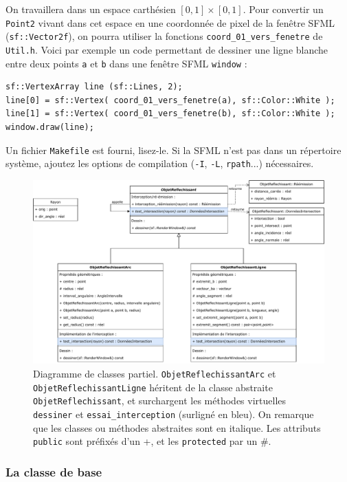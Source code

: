 \documentclass{book}
\newcommand{\inline}[1]{\texttt{#1}}
\def\filename{\texttt}
\begin{document}
On travaillera dans un espace carthésien $[0,1]\times[0,1]$. Pour convertir un \inline{Point2} vivant dans cet espace en une coordonnée de pixel de la fenêtre SFML (\inline{sf::Vector2f}), on pourra utiliser la fonctions \inline{coord_01_vers_fenetre} de \filename{Util.h}. Voici par exemple un code permettant de dessiner une ligne blanche entre deux points \inline{a} et \inline{b} dans une fenêtre SFML \inline{window} :
\begin{verbatim}
sf::VertexArray line (sf::Lines, 2);
line[0] = sf::Vertex( coord_01_vers_fenetre(a), sf::Color::White );
line[1] = sf::Vertex( coord_01_vers_fenetre(b), sf::Color::White );
window.draw(line);
\end{verbatim}

Un fichier \filename{Makefile} est fourni, lisez-le. Si la SFML n'est pas dans un répertoire système, ajoutez les options de compilation (\texttt{-I}, \texttt{-L}, \texttt{rpath}...) nécessaires.

\begin{figure}[H]
  \centering
  \includegraphics[width=\textwidth]{TD5bis/class-diagram.pdf}
  \caption{Diagramme de classes partiel. \texttt{ObjetReflechissantArc} et \texttt{ObjetReflechissantLigne} héritent de la classe abstraite \texttt{ObjetReflechissant}, et surchargent les méthodes virtuelles \inline{dessiner} et \inline{essai_interception} (surligné en bleu). On remarque que les classes ou méthodes abstraites sont en italique. Les attributs \inline{public} sont préfixés d'un +, et les \inline{protected} par un \#.}
  \label{fig:diagclasses1}
\end{figure}

\subsubsection{La classe de base}
\end{document}
